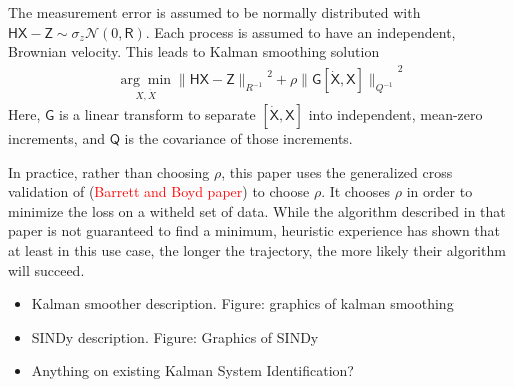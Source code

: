 \documentclass{article}
\newcommand{\red}[1]{\textcolor{red}{#1}}
\newcommand{\mat}[1]{\boldsymbol{\mathsf{#1}}}
\begin{document}
The measurement error is assumed to be normally distributed with $\mat H \mat X - \mat Z \sim \sigma_z \mathcal N(0, \mat R)$.  Each process is assumed to have an independent, Brownian velocity.  This leads to Kalman smoothing solution 
\begin{align}
    \underset{X, \dot X}{\arg\min}{\|\mat H \mat X - \mat Z\|_{R^{-1}}}^2 + \rho {\|\mat G [\mat {\dot X}, \mat X]\|_{Q^{-1}}}^2
\end{align}
Here, $\mat G$ is a linear transform to separate $[\mat{\dot X}, \mat X]$ into independent, mean-zero increments, and $\mat Q$ is the covariance of those increments.

In practice, rather than choosing $\rho$, this paper uses the generalized cross validation of (\red{Barrett and Boyd paper}) to choose $\rho$.  It chooses $\rho$ in order to minimize the loss on a witheld set of data.  While the algorithm described in that paper is not guaranteed to find a minimum, heuristic experience has shown that at least in this use case, the longer the trajectory, the more likely their algorithm will succeed.

\begin{itemize}
    \item Kalman smoother description.  Figure: graphics of kalman smoothing
    \item SINDy description.  Figure: Graphics of SINDy
    \item Anything on existing Kalman System Identification?
\end{itemize}
\end{document}
